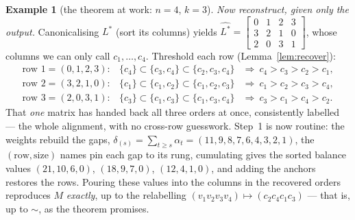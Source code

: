 \documentclass[11pt,a4paper]{article}
\theoremstyle{definition}
\newtheorem{example}[definition]{Example}
\theoremstyle{plain}
\begin{document}
\begin{example}[the theorem at work: $n=4$, $k=3$]
\smallskip\noindent\emph{Now reconstruct, given only the output.} Canonicalising
$L^\ast$ (sort its columns) yields
$\widehat{L^\ast}=\left[\begin{smallmatrix}0&1&2&3\\3&2&1&0\\2&0&3&1\end{smallmatrix}\right]$,
whose columns we can only call $c_1,\dots,c_4$. Threshold each row
(Lemma~\ref{lem:recover}):
\[
\begin{array}{lll}
\text{row }1=(0,1,2,3): & \{c_4\}\subset\{c_3,c_4\}\subset\{c_2,c_3,c_4\} & \Rightarrow\ c_4{>}c_3{>}c_2{>}c_1,\\
\text{row }2=(3,2,1,0): & \{c_1\}\subset\{c_1,c_2\}\subset\{c_1,c_2,c_3\} & \Rightarrow\ c_1{>}c_2{>}c_3{>}c_4,\\
\text{row }3=(2,0,3,1): & \{c_3\}\subset\{c_1,c_3\}\subset\{c_1,c_3,c_4\} & \Rightarrow\ c_3{>}c_1{>}c_4{>}c_2.
\end{array}
\]
That \emph{one} matrix has handed back all three orders at once, consistently
labelled --- the whole alignment, with no cross-row guesswork. Step~1 is now
routine: the weights rebuild the gaps,
$\delta_{(s)}=\sum_{t\ge s}\alpha_t=(11,9,8,7,6,4,3,2,1)$, the
$(\text{row},\text{size})$ names pin each gap to its rung, cumulating gives the
sorted balance values $(21,10,6,0)$, $(18,9,7,0)$, $(12,4,1,0)$, and adding the
anchors restores the rows. Pouring these values into the columns in the recovered
orders reproduces $M$ \emph{exactly}, up to the relabelling
$(v_1v_2v_3v_4)\mapsto(c_2c_4c_1c_3)$ --- that is, up to $\sim$, as the theorem
promises.
\end{example}
\end{document}
